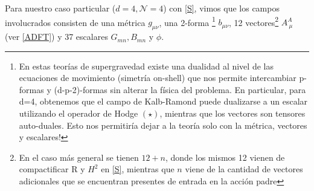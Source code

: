 \documentclass{article}
\numberwithin{equation}{section}
\begin{document}
Para nuestro caso particular ($ d=4, \mathcal{N}=4 $) con \ref{S}, vimos que los campos involucrados consisten de una métrica $ g_{\mu \nu} $, una 2-forma
\footnote{En estas teorías de supergravedad existe una dualidad al nivel de las ecuaciones de movimiento (simetría on-shell) que nos permite intercambiar p-formas y (d-p-2)-formas sin alterar la física del problema. En particular, para d=4, obtenemos que el campo de Kalb-Ramond puede dualizarse a un escalar utilizando el operador de Hodge $ (\star) $, mientras que los vectores son tensores auto-duales. Esto nos permitiría dejar a la teoría solo con la métrica, vectores y escalares!}
$ b_{\mu \nu} $, 12 vectores\footnote{En el caso más general se tienen $ 12 + n $, donde los mismos 12 vienen de compactificar R y $ H^2 $ en \ref{S}, mientras que $ n $ viene de la cantidad de vectores adicionales que se encuentran presentes de entrada en la acción padre } 
$ A_{\ \mu}^A $ (ver \ref{ADFT}) y 37 escalares $ G_{m n}, B_{m n} $ y $ \phi $.
\end{document}
